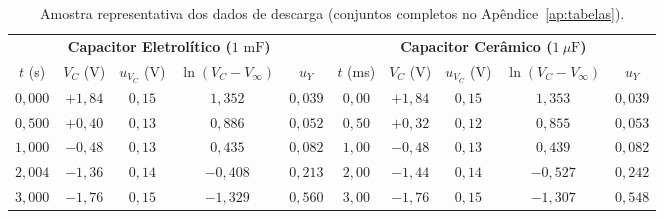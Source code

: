 \documentclass[12pt, a4paper]{article}
\begin{document}
\begin{table}[H]
    \centering
    \caption{Amostra representativa dos dados de descarga (conjuntos completos no Apêndice~\ref{ap:tabelas}).}
    \label{tab:amostra_dados}
    \vspace{-0.15cm}
    \scriptsize
    \setlength{\tabcolsep}{3.5pt}
    \begin{tabular}{ccccc|ccccc}
        \toprule
        \multicolumn{5}{c|}{\textbf{Capacitor Eletrolítico ($1\text{ mF}$)}} & \multicolumn{5}{c}{\textbf{Capacitor Cerâmico ($1\ \mu\text{F}$)}} \\
        $t$ (s) & $V_C$ (V) & $u_{V_C}$ (V) & $\ln(V_C - V_\infty)$ & $u_Y$ & $t$ (ms) & $V_C$ (V) & $u_{V_C}$ (V) & $\ln(V_C - V_\infty)$ & $u_Y$ \\
        \midrule
        $0{,}000$ & $+1{,}84$ & $0{,}15$ & $1{,}352$ & $0{,}039$ & $0{,}00$ & $+1{,}84$ & $0{,}15$ & $1{,}353$ & $0{,}039$ \\
        $0{,}500$ & $+0{,}40$ & $0{,}13$ & $0{,}886$ & $0{,}052$ & $0{,}50$ & $+0{,}32$ & $0{,}12$ & $0{,}855$ & $0{,}053$ \\
        $1{,}000$ & $-0{,}48$ & $0{,}13$ & $0{,}435$ & $0{,}082$ & $1{,}00$ & $-0{,}48$ & $0{,}13$ & $0{,}439$ & $0{,}082$ \\
        $2{,}004$ & $-1{,}36$ & $0{,}14$ & $-0{,}408$ & $0{,}213$ & $2{,}00$ & $-1{,}44$ & $0{,}14$ & $-0{,}527$ & $0{,}242$ \\
        $3{,}000$ & $-1{,}76$ & $0{,}15$ & $-1{,}329$ & $0{,}560$ & $3{,}00$ & $-1{,}76$ & $0{,}15$ & $-1{,}307$ & $0{,}548$ \\
        \bottomrule
    \end{tabular}
\end{table}
\end{document}
